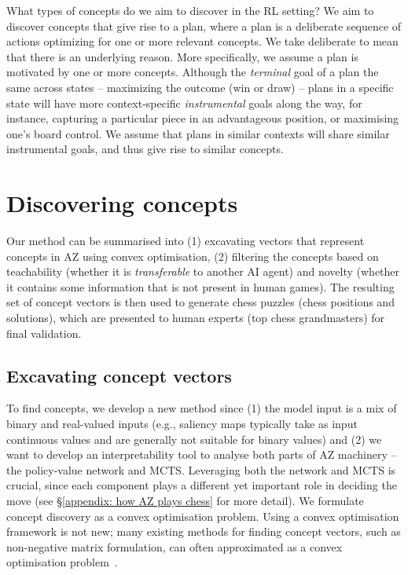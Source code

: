 \documentclass{article}
\begin{document}
What types of concepts do we aim to discover in the RL setting?
We aim to discover concepts that give rise to a plan, where a plan is a deliberate sequence of actions optimizing for one or more relevant concepts.
We take deliberate to mean that there is an underlying reason. More specifically, we assume a plan is motivated by one or more concepts. 
Although the \textit{terminal} goal of a plan the same across states -- maximizing the outcome (win or draw) -- plans in a specific state will have more context-specific \textit{instrumental} goals along the way, for instance, capturing a particular piece in an advantageous position, or maximising one's board control. We assume that plans in similar contexts will share similar instrumental goals, and thus give rise to similar concepts. 

\section{Discovering concepts} \label{sec:discovering_concepts}

Our method can be summarised into (1) excavating vectors that represent concepts in AZ using convex optimisation, (2) filtering the concepts based on teachability (whether it is \textit{transferable} to another AI agent) and novelty (whether it contains some information that is not present in human games). The resulting set of concept vectors is then used to generate chess puzzles (chess positions and solutions), which are presented to human experts (top chess grandmasters) for final validation. 

\subsection{Excavating concept vectors}\label{sec:convex_opt}
To find concepts, we develop a new method since (1) the model input is a mix of binary and real-valued
inputs (e.g., saliency maps typically take as input continuous values and are generally not suitable for binary values) and (2) we want to develop an interpretability tool to analyse both parts of AZ machinery -- the policy-value network and MCTS. Leveraging both the network and MCTS is crucial, since each component plays a different yet important role in deciding the move (see \S\ref{appendix: how AZ plays chess} for more detail).
We formulate concept discovery as a convex optimisation problem. 
Using a convex optimisation framework is not new; many existing methods for finding concept vectors, such as non-negative matrix formulation, can often approximated as a convex optimisation problem~\citep{ding2008convex}. 
\end{document}

